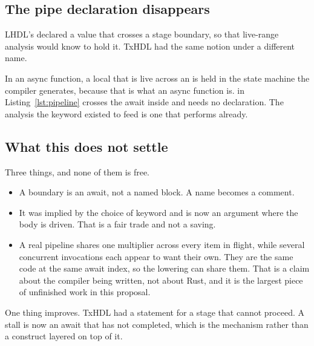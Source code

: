 \subsection{The pipe declaration disappears}

LHDL's  declared a value that crosses a stage boundary, so that
live-range analysis would know to hold it. TxHDL had the same notion under
a different name.

In an async function, a local that is live across an  is held
in the state machine the compiler generates, because that is what an async
function is.  in Listing~\ref{lst:pipeline} crosses the await inside
 and needs no declaration. The analysis the  keyword existed to feed
is one that  performs already.

\subsection{What this does not settle}

Three things, and none of them is free.

\begin{itemize}
  \item {} A boundary is an await, not a named
        block. A name becomes a comment.
  \item {} It was
        implied by the choice of keyword and is now an argument where the
        body is driven. That is a fair trade and not a saving.
  \item {} A real pipeline shares
        one multiplier across every item in flight, while several
        concurrent invocations each appear to want their own. They are the
        same code at the same await index, so the lowering can share them.
        That is a claim about the compiler being written, not about Rust,
        and it is the largest piece of unfinished work in this proposal.
\end{itemize}

One thing improves. TxHDL had a  statement for a stage that
cannot proceed. A stall is now an await that has not completed, which is
the mechanism rather than a construct layered on top of it.
